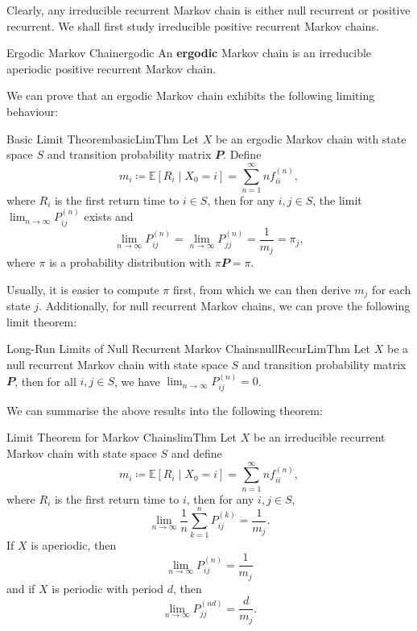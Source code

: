 \documentclass[math, code]{amznotes}
\theoremstyle{remark}
\begin{document}
Clearly, any irreducible recurrent Markov chain is either null recurrent or positive recurrent. We shall first study irreducible positive recurrent Markov chains.
\begin{dfnbox}{Ergodic Markov Chain}{ergodic}
    An {\color{red} \textbf{ergodic}} Markov chain is an irreducible aperiodic positive recurrent Markov chain.
\end{dfnbox}
We can prove that an ergodic Markov chain exhibits the following limiting behaviour:
\begin{thmbox}{Basic Limit Theorem}{basicLimThm}
    Let $X$ be an ergodic Markov chain with state space $S$ and transition probability matrix $\mathbfit{P}$. Define 
    \begin{equation*}
        m_i \coloneqq \mathbb{E}\left[R_i \mid X_0 = i\right] = \sum_{n = 1}^{\infty}nf^{(n)}_{ii},
    \end{equation*}
    where $R_i$ is the first return time to $i \in S$, then for any $i, j \in S$, the limit $\lim_{n \to \infty}P_{ij}^{(n)}$ exists and 
    \begin{equation*}
        \lim_{n \to \infty}P_{ij}^{(n)} = \lim_{n \to \infty}P_{jj}^{(n)} = \frac{1}{m_j} = \pi_j,
    \end{equation*}
    where $\pi$ is a probability distribution with $\pi\mathbfit{P} = \pi$.
\end{thmbox}
Usually, it is easier to compute $\pi$ first, from which we can then derive $m_j$ for each state $j$. Additionally, for null recurrent Markov chains, we can prove the following limit theorem:
\begin{probox}{Long-Run Limits of Null Recurrent Markov Chains}{nullRecurLimThm}
    Let $X$ be a null recurrent Markov chain with state space $S$ and transition probability matrix $\mathbfit{P}$, then for all $i, j \in S$, we have $\lim_{n \to \infty}P^{(n)}_{ij} = 0$.
\end{probox}
We can summarise the above results into the following theorem:
\begin{thmbox}{Limit Theorem for Markov Chains}{limThm}
    Let $X$ be an irreducible recurrent Markov chain with state space $S$ and define 
    \begin{equation*}
        m_i \coloneqq \mathbb{E}\left[R_i \mid X_0 = i\right] = \sum_{n = 1}^{\infty}nf^{(n)}_{ii},
    \end{equation*}
    where $R_i$ is the first return time to $i$, then for any $i, j \in S$, 
    \begin{equation*}
        \lim_{n \to \infty}\frac{1}{n}\sum_{k = 1}^{n}P^{(k)}_{ij} = \frac{1}{m_j}.
    \end{equation*}
    If $X$ is aperiodic, then 
    \begin{equation*}
        \lim_{n \to \infty}P^{(n)}_{ij} = \frac{1}{m_j}
    \end{equation*}
    and if $X$ is periodic with period $d$, then 
    \begin{equation*}
        \lim_{n \to \infty}P^{(nd)}_{jj} = \frac{d}{m_j}.
    \end{equation*}
\end{thmbox}
\end{document}
